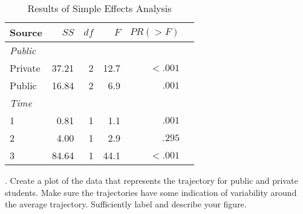 \documentclass[onecolumn,10pt]{jhwhw}
\begin{document}
\begin{table}[h!]
\begin{center}
\begin{tabular}{l r r r r r}
\toprule
Source & $SS$ & $df$ & $F$ & $PR(>F)$ \\
\midrule
\it{Public} & & & & \\
\hspace{1em} Private     & 37.21 &  2  & 12.7 & $<.001$ \\
\hspace{1em} Public      & 16.84 &  2  &  6.9 & $ .001$ \\
\it{Time} & & & & \\
\hspace{1em} 1      &  0.81 &  1  &  1.1 & $ .001$\\
\hspace{1em} 2      &  4.00 &  1  &  2.9 & $ .295$\\
\hspace{1em} 3      & 84.64 &  1  & 44.1 & $<.001$\\
\bottomrule
\end{tabular}
\end{center}
\caption{Results of Simple Effects Analysis}
\end{table}

. Create a plot of the data that represents the trajectory for public and private students. Make sure the trajectories have some indication of variability around the average trajectory. Sufficiently label and describe your figure.
\end{document}

